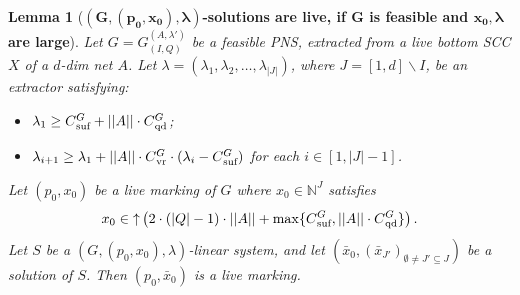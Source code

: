 \documentclass[11pt,a4paper]{amsart}
\newcommand{\nnorm}[1]{||#1||}
\newcommand{\vr}{{}_\textnormal{vr}}
\newcommand{\upC}[1]{\mathop{\uparrow}#1}
\newcommand{\suf}{{}_\textnormal{suf}}
\newcommand{\qd}{{}_\textnormal{qd}}
\newcommand{\Nat}{\mathbb{N}}
\newcommand{\setN}{\Nat}
\theoremstyle{plain}
\newtheorem{lem}[thm]{Lemma}
\theoremstyle{definition}
\theoremstyle{defC}
\theoremstyle{thmC}
\begin{document}
\begin{lem}[\textbf{$\bm{(G,(p_0,x_0),\lambda)}$-solutions are live,
	if $\bm{G}$ is feasible and 
	 $\bm{x_0,\lambda}$ are large}]\label{lem:finalPNS}
	Let $G=G_{(I,Q)}^{(A,\lambda')}$ be a feasible PNS, extracted
	from a live bottom SCC $X$ of
	a $d$-dim net $A$.
Let
	$\lambda=(\lambda_1,\lambda_2,\dots,\lambda_{|J|})$,
	where $J=[1,d]\smallsetminus I$, be an extractor
	satisfying:
	\begin{itemize}
		\item
		$\lambda_1\geq
C\suf^G+\nnorm{A}\cdot C\qd^G$;
\item
	$\lambda_{i+1}\geq \lambda_1 + \nnorm{A}\cdot C\vr^{G}\cdot
			(\lambda_i-C\suf^G)$ for each
			$i\in[1,|J|{-}1]$.
	\end{itemize}
	Let $(p_0,x_0)$ be a live marking of $G$ where $x_0\in\setN^J$
	satisfies 
	\[x_0\in\upC{\left(
2\cdot(|Q|-1)\cdot\nnorm{A}+
		\max\{C\suf^G,\nnorm{A}\cdot C\qd^G\}\right)}.\]
Let $S$ be a $(G,(p_0,x_0),\lambda)$-linear system,
and let $(\bar{x}_0,(\bar{x}_{J'})_{\emptyset\neq
	J'\subseteq J})$ be a solution of $S$.
Then
 $(p_0,\bar{x}_0)$ is a live marking. 
\end{lem}	
\end{document}
